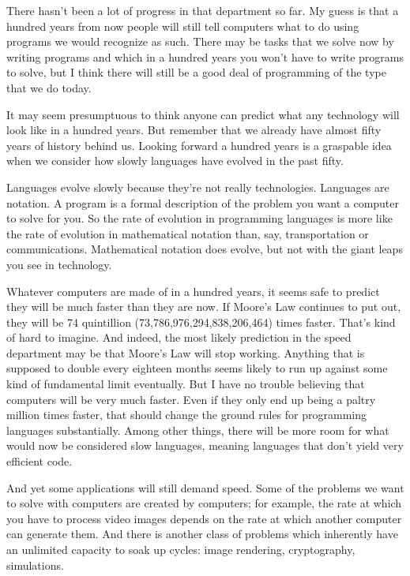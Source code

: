 There hasn't been a lot of progress in that department so far. My guess
is that a hundred years from now people will still tell computers what
to do using programs we would recognize as such. There may be tasks that
we solve now by writing programs and which in a hundred years you won't
have to write programs to solve, but I think there will still be a good
deal of programming of the type that we do today.

It may seem presumptuous to think anyone can predict what any technology
will look like in a hundred years. But remember that we already have
almost fifty years of history behind us. Looking forward a hundred years
is a graspable idea when we consider how slowly languages have evolved
in the past fifty.

Languages evolve slowly because they're not really technologies.
Languages are notation. A program is a formal description of the problem
you want a computer to solve for you. So the rate of evolution in
programming languages is more like the rate of evolution in mathematical
notation than, say, transportation or communications. Mathematical
notation does evolve, but not with the giant leaps you see in
technology.

Whatever computers are made of in a hundred years, it seems safe to
predict they will be much faster than they are now. If Moore's Law
continues to put out, they will be 74 quintillion
(73,786,976,294,838,206,464) times faster. That's kind of hard to
imagine. And indeed, the most likely prediction in the speed department
may be that Moore's Law will stop working. Anything that is supposed to
double every eighteen months seems likely to run up against some kind of
fundamental limit eventually. But I have no trouble believing that
computers will be very much faster. Even if they only end up being a
paltry million times faster, that should change the ground rules for
programming languages substantially. Among other things, there will be
more room for what would now be considered slow languages, meaning
languages that don't yield very efficient code.

And yet some applications will still demand speed. Some of the problems
we want to solve with computers are created by computers; for example,
the rate at which you have to process video images depends on the rate
at which another computer can generate them. And there is another class
of problems which inherently have an unlimited capacity to soak up
cycles: image rendering, cryptography, simulations.

